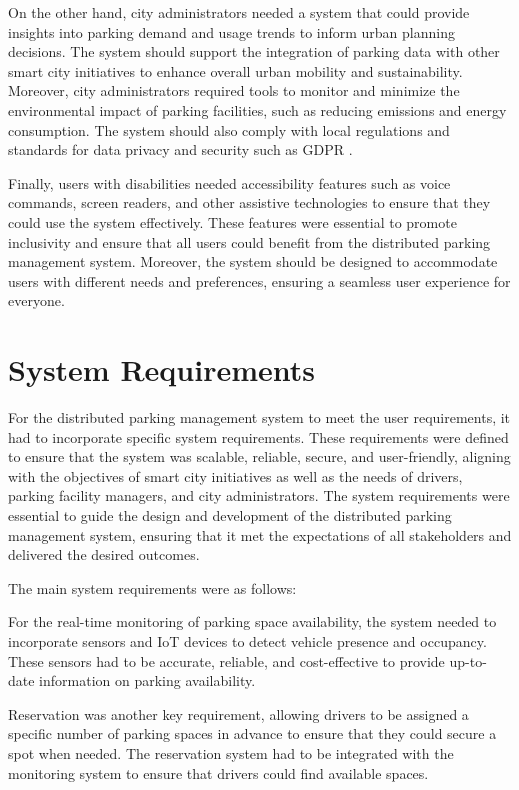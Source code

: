 \documentclass[oneside, 12pt, a4paper, draft]{book}
\begin{document}
On the other hand, city administrators needed a system that could provide insights into parking demand and usage trends to inform urban planning decisions.
The system should support the integration of parking data with other smart city initiatives to enhance overall urban mobility and sustainability.
Moreover, city administrators required tools to monitor and minimize the environmental impact of parking facilities, such as reducing emissions and energy consumption.
The system should also comply with local regulations and standards for data privacy and security such as GDPR \autocite{gdpr}.

Finally, users with disabilities needed accessibility features such as voice commands, screen readers, and other assistive technologies to ensure that they could use the system effectively.
These features were essential to promote inclusivity and ensure that all users could benefit from the distributed parking management system.
Moreover, the system should be designed to accommodate users with different needs and preferences, ensuring a seamless user experience for everyone.
\section{System Requirements}
\label{sec:orgeed0ee1}
For the distributed parking management system to meet the user requirements, it had to incorporate specific system requirements.
These requirements were defined to ensure that the system was scalable, reliable, secure, and user-friendly, aligning with the objectives of smart city initiatives as well as the needs of drivers, parking facility managers, and city administrators.
The system requirements were essential to guide the design and development of the distributed parking management system, ensuring that it met the expectations of all stakeholders and delivered the desired outcomes.

The main system requirements were as follows:

For the real-time monitoring of parking space availability, the system needed to incorporate sensors and IoT devices to detect vehicle presence and occupancy.
These sensors had to be accurate, reliable, and cost-effective to provide up-to-date information on parking availability.

Reservation was another key requirement, allowing drivers to be assigned a specific number of parking spaces in advance to ensure that they could secure a spot when needed.
The reservation system had to be integrated with the monitoring system to ensure that drivers could find available spaces.
\end{document}
